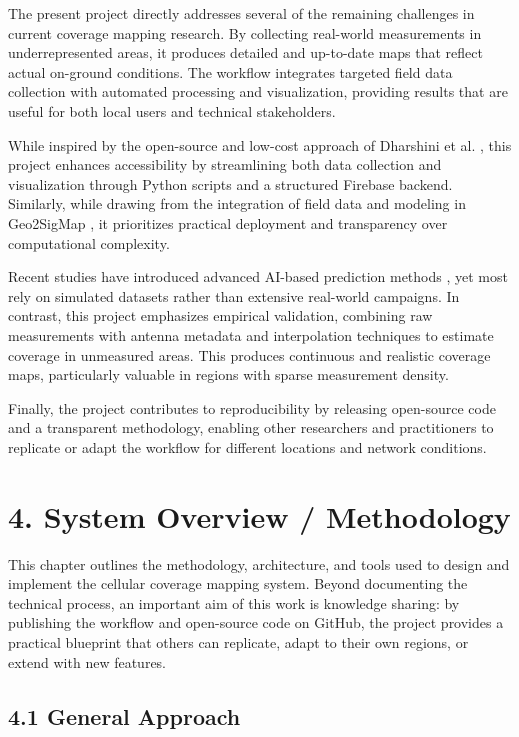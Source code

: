 \documentclass[11pt]{article}
\begin{document}
The present project directly addresses several of the remaining
challenges in current coverage mapping research. By collecting
real-world measurements in underrepresented areas, it produces detailed
and up-to-date maps that reflect actual on-ground conditions. The
workflow integrates targeted field data collection with automated
processing and visualization, providing results that are useful for both
local users and technical stakeholders.

While inspired by the open-source and low-cost approach of Dharshini et
al. \cite{dharshini2022}, this project enhances accessibility by
streamlining both data collection and visualization through Python
scripts and a structured Firebase backend. Similarly, while drawing from
the integration of field data and modeling in Geo2SigMap
\cite{li2023}, it prioritizes practical deployment and transparency over
computational complexity.

Recent studies have introduced advanced AI-based prediction methods
\cite{zhang2023, ahmed2022}, yet most rely on simulated datasets rather
than extensive real-world campaigns. In contrast, this project emphasizes
empirical validation, combining raw measurements with antenna metadata
and interpolation techniques \cite{shepard1968} to estimate coverage in
unmeasured areas. This produces continuous and realistic coverage maps,
particularly valuable in regions with sparse measurement density.

Finally, the project contributes to reproducibility by releasing
open-source code and a transparent methodology, enabling other
researchers and practitioners to replicate or adapt the workflow for
different locations and network conditions.


\hypertarget{system-overview-methodology}{%
\section{4. System Overview /
Methodology}\label{system-overview-methodology}}

This chapter outlines the methodology, architecture, and tools used to
design and implement the cellular coverage mapping system. Beyond
documenting the technical process, an important aim of this work is
knowledge sharing: by publishing the workflow and open-source code on
GitHub, the project provides a practical blueprint that others can
replicate, adapt to their own regions, or extend with new features.

\hypertarget{general-approach}{%
\subsection{4.1 General Approach}\label{general-approach}}
\end{document}
